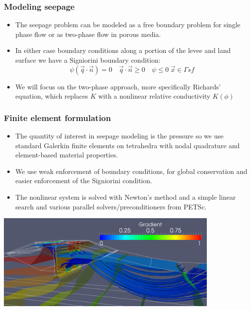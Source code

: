 \documentclass{beamer}
\begin{document}
\begin{frame}
  \frametitle{Modeling seepage}
  \begin{itemize}
    \item The seepage problem can be modeled as a free boundary
      problem for single phase flow or as two-phase flow in porous
      media.
    \item In either case boundary conditions along a portion of the
      levee and land surface we have a Signiorini boundary condition:
      \begin{equation}
\psi(\vec q \cdot \vec n) = 0 \quad \vec q \cdot \vec n \geq 0 \quad
\psi \leq 0 \; \vec x \in \Gamma{sf}
      \end{equation}
    \item We will focus on the two-phase approach, more specifically
      Richards' equation, which replaces $K$ with a nonlinear relative
      conductivity $K(\phi)$
  \end{itemize}
\end{frame}

\begin{frame}
  \frametitle{Finite element formulation}
  \begin{itemize}
  \item The quantity of interest in seepage modeling is the pressure
    so we use standard Galerkin finite elements on tetrahedra with
    nodal quadrature and element-based material properties.
  \item We use weak enforcement of boundary conditions, for global
    conservation and easier enforcement of the Signiorini condition.
  \item The nonlinear system is solved with Newton's method and a
    simple linear search and various parallel solvers/preconditioners
    from PETSc.
  \end{itemize}
\end{frame}

\begin{frame}
\end{frame}

\begin{frame}
\includegraphics[width=4.35in]{pocketLevee_nopipe.png}
\end{frame}
\end{document}

